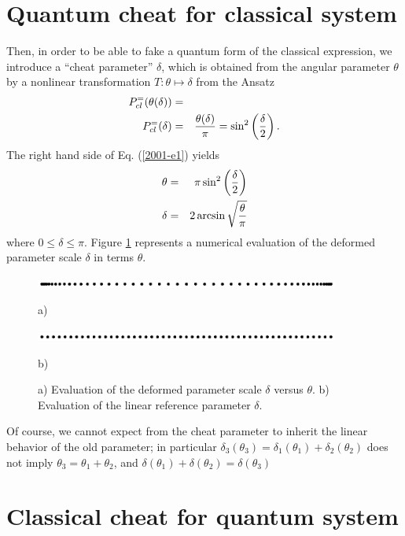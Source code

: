 \section{Quantum cheat for classical system}

Then, in order to be able to fake
a quantum form of the classical expression,
we introduce a ``cheat parameter'' $\delta $,
which is obtained from the angular parameter $\theta $
by a nonlinear transformation
$T:\theta \mapsto \delta$
from the Ansatz
\begin{eqnarray}
P^{=}_{cl}(\theta (\delta ))
&=&
\nonumber \\
P^{=}_{cl}(\delta )
&=&
{\theta (\delta )\over \pi}=
\sin^2 \left({\delta \over 2}\right)
.
\label{2001-e1}
\end{eqnarray}
The right hand side of Eq. (\ref{2001-e1})
yields
\begin{eqnarray}
\theta &=& \pi \sin^2 \left({\delta \over 2} \right)\\
\delta &=& 2\arcsin \sqrt{{\theta \over \pi}}
\end{eqnarray}
where $0\le \delta  \le \pi$.
Figure   \ref{2001-cheat-f1} represents a numerical evaluation
of the deformed parameter scale $\delta$ in terms $\theta$.
\begin{figure}
 \includegraphics[width=10cm]{2001-cheat-f1.eps}
\begin{center}a)\end{center}
 \includegraphics[width=10cm]{2001-cheat-fbrav.eps}
\begin{center}b)\end{center}
 \caption{
a) Evaluation of the deformed parameter scale $\delta$ versus $\theta$.
b) Evaluation of the linear reference parameter $\delta$.
}
\label{2001-cheat-f1}
\end{figure}



Of course, we cannot expect from the cheat parameter to inherit the linear behavior of the
old parameter; in particular
$
\delta_3(\theta_3)
=
\delta_1(\theta_1)+
\delta_2(\theta_2)$ does not imply $\theta_3=\theta_1+\theta_2$,
and
$\delta(\theta_1)+\delta(\theta_2)=\delta(\theta_3)$




\section{Classical cheat for quantum system}


